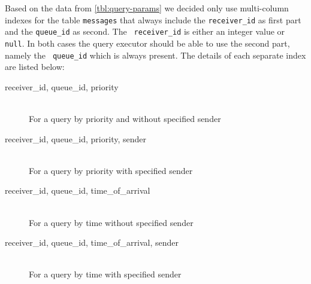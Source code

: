 \documentclass[a4paper, oneside]{csthesis}
\begin{document}
\begin{table}[t]
    \centering
    
    \begin{adjustbox}{center}
    \end{adjustbox}
    \caption{Parameters of a message query}
    \label{tbl:query-params}
\end{table}

    Based on the data from \cref{tbl:query-params} we decided only use
    multi-column indexes for the table {\tt messages} that always include the
    {\tt receiver\_id} as first part and the {\tt queue\_id} as second. The {\tt
    receiver\_id} is either an integer value or {\tt null}. In both cases the
    query executor should be able to use the second part, namely the {\tt
    queue\_id} which is always present. The details of each separate index are
    listed below:
    
    \begin{description}
    \item[receiver\_id, queue\_id, priority] \ \\
        For a query by priority and without specified sender
    \item[receiver\_id, queue\_id, priority, sender] \ \\
        For a query by priority with specified sender
    \item[receiver\_id, queue\_id, time\_of\_arrival] \ \\
        For a query by time without specified sender
    \item[receiver\_id, queue\_id, time\_of\_arrival, sender] \ \\
        For a query by time with specified sender
    \end{description}
\end{document}

